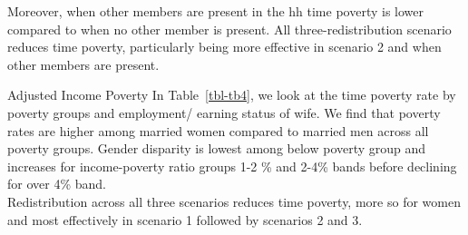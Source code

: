 \documentclass[
  11pt,
]{article}
\begin{document}
Moreover, when other members are present in the hh time poverty is lower
compared to when no other member is present. All three-redistribution
scenario reduces time poverty, particularly being more effective in
scenario 2 and when other members are present.

\begin{table}

\caption{\label{tbl-tb3}Time Poverty by Household Structure}


\end{table}%

Adjusted Income Poverty In Table~\ref{tbl-tb4}, we look at the time
poverty rate by poverty groups and employment/ earning status of wife.
We find that poverty rates are higher among married women compared to
married men across all poverty groups. Gender disparity is lowest among
below poverty group and increases for income-poverty ratio groups 1-2 \%
and 2-4\% bands before declining for over 4\% band.\\
Redistribution across all three scenarios reduces time poverty, more so
for women and most effectively in scenario 1 followed by scenarios 2 and
3.
\end{document}
